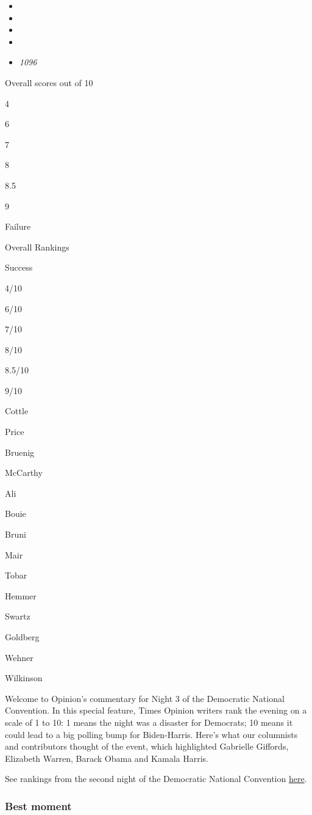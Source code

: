 \begin{itemize}
\item
\item
\item
\item
\item
  \emph{1096}
\end{itemize}

Overall scores out of 10

4

6

7

8

8.5

9

Failure

Overall Rankings

Success

4/10

6/10

7/10

8/10

8.5/10

9/10

Cottle

Price

Bruenig

McCarthy

Ali

Bouie

Bruni

Mair

Tobar

Hemmer

Swartz

Goldberg

Wehner

Wilkinson

Welcome to Opinion's commentary for Night 3 of the Democratic National
Convention. In this special feature, Times Opinion writers rank the
evening on a scale of 1 to 10: 1 means the night was a disaster for
Democrats; 10 means it could lead to a big polling bump for
Biden-Harris. Here's what our columnists and contributors thought of the
event, which highlighted Gabrielle Giffords, Elizabeth Warren, Barack
Obama and Kamala Harris.

See rankings from the second night of the Democratic National Convention
\href{https://www.nytimes3xbfgragh.onion/interactive/2020/08/19/opinion/democratic-convention-best-worst-night-2.html}{here}.

\hypertarget{best-moment}{%
\subsubsection{Best moment}\label{best-moment}}

